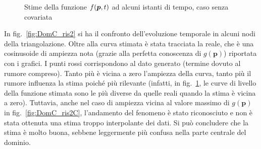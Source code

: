 \documentclass[a4paper,11pt,twoside,openright]{book}							%
\begin{document}
\begin{figure}[H]
{   }
	\caption{Stime della funzione $f(\protect\bm{p},t)$ ad alcuni istanti di tempo, caso senza covariata}
	\label{fig:DomC_ris}
\end{figure}
\newpage
In fig.~\ref{fig:DomC_ris2} si ha il confronto dell'evoluzione temporale in alcuni nodi della triangolazione. Oltre alla curva stimata è stata tracciata la reale, che è una cosinusoide di ampiezza nota (grazie alla perfetta conoscenza di $g(\bm p)$) riportata con i grafici. I punti rossi corrispondono al dato generato (termine dovuto al rumore compreso). Tanto più è vicina a zero l'ampiezza della curva, tanto più il rumore influenza la stima poiché più rilevante (infatti, in fig.~\ref{fig:DomC_ris}, le curve di livello della funzione stimata sono le più diverse da quelle reali quando la stima è vicina a zero). Tuttavia, anche nel caso di ampiezza vicina al valore massimo di $g(\bm p)$ in fig.~\ref{fig:DomC_ris2C}, l'andamento del fenomeno è stato riconosciuto e non è stata ottenuta una stima troppo interpolante dei dati. Si può concludere che la stima è molto buona, sebbene leggermente più confusa nella parte centrale del dominio.
\end{document}
